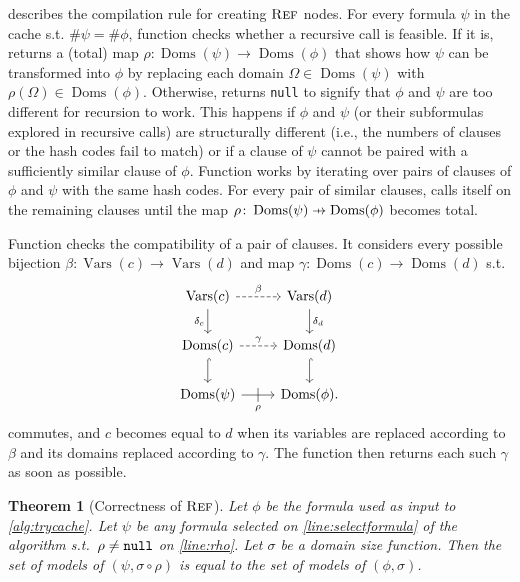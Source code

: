 \documentclass{article}
\newtheorem{theorem}{Theorem}
\newcommand\pfun{\mathrel{\ooalign{\hfil$\mapstochar\mkern5mu$\hfil\cr$\to$\cr}}}
\newcommand{\nulll}{\texttt{\textup{null}}}
\DeclareMathOperator{\Reff}{\textsc{Ref}}
\DeclareMathOperator{\Doms}{Doms}
\DeclareMathOperator{\Vars}{Vars}
\begin{document}
 describes the compilation rule for creating $\Reff$ nodes.
For every formula $\psi$ in the cache s.t. $\#\psi = \#\phi$, function
\identifyRecursion checks whether a recursive call is feasible. If it is,
\identifyRecursion returns a (total) map
$\rho\colon \Doms(\psi) \to \Doms(\phi)$ that shows how $\psi$ can be
transformed into $\phi$ by replacing each domain $\Omega \in \Doms(\psi)$ with
$\rho(\Omega) \in \Doms(\phi)$. Otherwise, \identifyRecursion returns \nulll{}
to signify that $\phi$ and $\psi$ are too different for recursion to work. This
happens if $\phi$ and $\psi$ (or their subformulas explored in recursive calls)
are structurally different (i.e., the numbers of clauses or the hash codes fail
to match) or if a clause of $\psi$ cannot be paired with a sufficiently similar
clause of $\phi$. Function \identifyRecursion works by iterating over pairs of
clauses of $\phi$ and $\psi$ with the same hash codes. For every pair of similar
clauses, \identifyRecursion calls itself on the remaining clauses until the map
$\rho\colon \Doms(\psi) \pfun \Doms(\phi)$ becomes total.

Function \generateMaps checks the compatibility of a pair of clauses. It
considers every possible bijection $\beta\colon \Vars(c) \to \Vars(d)$ and map
$\gamma\colon \Doms(c) \to \Doms(d)$ s.t.
\[
  \begin{tikzcd}
    \Vars(c) \ar[r, dashed, "\beta"] \arrow[d, swap, "\delta_c"] & \Vars(d) \ar[d, "\delta_d"] \\
    \Doms(c) \ar[r, dashed, "\gamma"] \ar[d, hookrightarrow] & \Doms(d) \ar[d, hookrightarrow] \\
    \Doms(\psi) \ar[r, swap, "\rho", "|" marking, outer sep=5pt] & \Doms(\phi).
  \end{tikzcd}
\]
commutes, and $c$ becomes equal to $d$ when its variables are replaced according
to $\beta$ and its domains replaced according to $\gamma$. The function then
returns each such $\gamma$ as soon as possible.

\begin{theorem}[Correctness of $\Reff$]
  Let $\phi$ be the formula used as input to \cref{alg:trycache}. Let $\psi$ be
  any formula selected on \cref{line:selectformula} of the algorithm s.t.\
  $\rho \ne \nulll$ on \cref{line:rho}. Let $\sigma$ be a domain size function.
  Then the set of models of $(\psi, \sigma \circ \rho)$ is equal to the set of
  models of $(\phi, \sigma)$.
\end{theorem}
\end{document}
